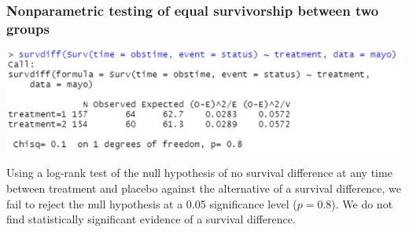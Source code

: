 \documentclass[10pt,t]{beamer}
\begin{document}
\begin{frame}
\frametitle{Nonparametric testing of equal survivorship between two groups}

\begin{center}
	\includegraphics[width=\textwidth]{figs/logrank_code.png}
\end{center}

Using a log-rank test of the null hypothesis of no survival difference at any time between treatment and placebo against the alternative of a survival difference, we fail to reject the null hypothesis at a 0.05 significance level ($p = 0.8$). We do not find statistically significant evidence of a survival difference. 

\end{frame}
\end{document}
